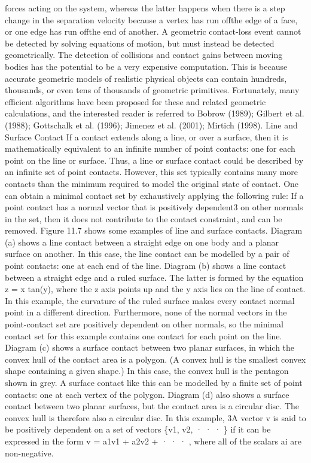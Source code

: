 forces acting on the system, whereas the latter happens when there is a step change in the separation velocity because a vertex has run offthe edge of a face, or one edge has run offthe end of another. A geometric contact-loss event cannot be detected by solving equations of motion, but must instead be detected geometrically. The detection of collisions and contact gains between moving bodies has the potential to be a very expensive computation. This is because accurate geometric models of realistic physical objects can contain hundreds, thousands, or even tens of thousands of geometric primitives. Fortunately, many efficient algorithms have been proposed for these and related geometric calculations, and the interested reader is referred to Bobrow (1989); Gilbert et al. (1988); Gottschalk et al. (1996); Jimenez et al. (2001); Mirtich (1998). Line and Surface Contact If a contact extends along a line, or over a surface, then it is mathematically equivalent to an infinite number of point contacts: one for each point on the line or surface. Thus, a line or surface contact could be described by an infinite set of point contacts. However, this set typically contains many more contacts than the minimum required to model the original state of contact. One can obtain a minimal contact set by exhaustively applying the following rule: If a point contact has a normal vector that is positively dependent3 on other normals in the set, then it does not contribute to the contact constraint, and can be removed. Figure 11.7 shows some examples of line and surface contacts. Diagram (a) shows a line contact between a straight edge on one body and a planar surface on another. In this case, the line contact can be modelled by a pair of point contacts: one at each end of the line. Diagram (b) shows a line contact between a straight edge and a ruled surface. The latter is formed by the equation z = x tan(y), where the z axis points up and the y axis lies on the line of contact. In this example, the curvature of the ruled surface makes every contact normal point in a different direction. Furthermore, none of the normal vectors in the point-contact set are positively dependent on other normals, so the minimal contact set for this example contains one contact for each point on the line. Diagram (c) shows a surface contact between two planar surfaces, in which the convex hull of the contact area is a polygon. (A convex hull is the smallest convex shape containing a given shape.) In this case, the convex hull is the pentagon shown in grey. A surface contact like this can be modelled by a finite set of point contacts: one at each vertex of the polygon. Diagram (d) also shows a surface contact between two planar surfaces, but the contact area is a circular disc. The convex hull is therefore also a circular disc. In this example, 3A vector v is said to be positively dependent on a set of vectors \{v1, v2, · · · \} if it can be expressed in the form v = a1v1 + a2v2 + · · · , where all of the scalars ai are non-negative.

